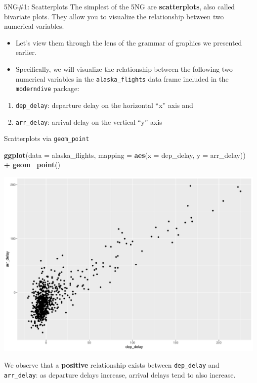 \documentclass[
  ignorenonframetext,
]{beamer}
\newenvironment{Shaded}{\begin{snugshade}}{\end{snugshade}}
\newcommand{\AttributeTok}[1]{\textcolor[rgb]{0.13,0.29,0.53}{#1}}
\newcommand{\FunctionTok}[1]{\textcolor[rgb]{0.13,0.29,0.53}{\textbf{#1}}}
\newcommand{\NormalTok}[1]{#1}
\newcommand{\SpecialCharTok}[1]{\textcolor[rgb]{0.81,0.36,0.00}{\textbf{#1}}}
\begin{document}
\begin{frame}[fragile]{5NG\#1: Scatterplots}
\protect\hypertarget{ng1-scatterplots}{}
The simplest of the 5NG are \textbf{scatterplots}, also called bivariate
plots. They allow you to visualize the relationship between two
numerical variables.

\begin{itemize}
\item
  Let's view them through the lens of the grammar of graphics we
  presented earlier.
\item
  Specifically, we will visualize the relationship between the following
  two numerical variables in the \texttt{alaska\_flights} data frame
  included in the \texttt{moderndive} package:
\end{itemize}

\begin{enumerate}
\item
  \texttt{dep\_delay}: departure delay on the horizontal ``x'' axis and
\item
  \texttt{arr\_delay}: arrival delay on the vertical ``y'' axis
\end{enumerate}
\end{frame}

\begin{frame}[fragile]{Scatterplots via \texttt{geom\_point}}
\protect\hypertarget{scatterplots-via-geom_point}{}
\tiny

\begin{Shaded}
\begin{Highlighting}[]
\FunctionTok{ggplot}\NormalTok{(}\AttributeTok{data =}\NormalTok{ alaska\_flights, }\AttributeTok{mapping =} \FunctionTok{aes}\NormalTok{(}\AttributeTok{x =}\NormalTok{ dep\_delay, }\AttributeTok{y =}\NormalTok{ arr\_delay)) }\SpecialCharTok{+} 
  \FunctionTok{geom\_point}\NormalTok{()}
\end{Highlighting}
\end{Shaded}

\begin{center}\includegraphics[width=0.7\linewidth,height=0.5\textheight]{Week2_Lect_files/figure-beamer/unnamed-chunk-20-1} \end{center}
\normalsize

We observe that a \textbf{positive} relationship exists between
\texttt{dep\_delay} and \texttt{arr\_delay}: as departure delays
increase, arrival delays tend to also increase.
\end{frame}
\end{document}
